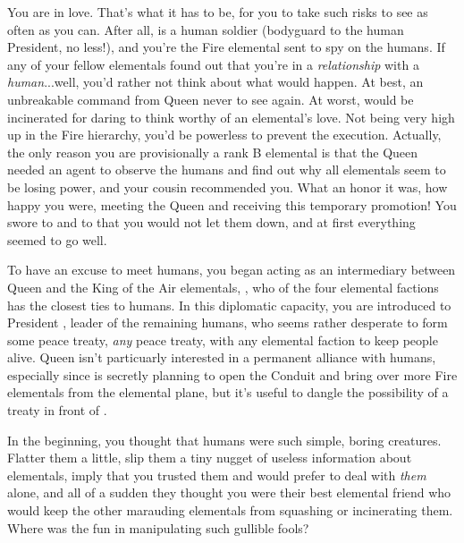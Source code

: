 \documentclass[char]{elementals}
\begin{document}
\name{\cJuliet{}}

You are in love.  That's what it has to be, for you to take such risks to see \cRomeo{\intro} as often as you can.  After all, \cRomeo{\they} is a human soldier (bodyguard to the human President, no less!), and you're the Fire elemental sent to spy on the humans.  If any of your fellow elementals found out that you're in a \emph{relationship} with a \emph{human}...well, you'd rather not think about what would happen.  At best, an unbreakable command from Queen \cQueen{\intro} never to see \cRomeo{} again.  At worst, \cRomeo{\they} would be incinerated for daring to think \cRomeo{\themselves} worthy of an elemental's love.  Not being very high up in the Fire hierarchy, you'd be powerless to prevent the execution.  Actually, the only reason you are provisionally a rank B elemental is that the Queen needed an agent to observe the humans and find out why all elementals seem to be losing power, and your cousin \cPyro{\intro} recommended you.  What an honor it was, how happy you were, meeting the Queen and receiving this temporary promotion!  You swore to \cQueen{\them} and to \cPyro{} that you would not let them down, and at first everything seemed to go well.

To have an excuse to meet humans, you began acting as an intermediary between Queen \cQueen{} and the King of the Air elementals, \cKing{\intro}, who of the four elemental factions has the closest ties to humans.  In this diplomatic capacity, you are introduced to President \cLeader{\intro}, leader of the remaining humans, who seems rather desperate to form some peace treaty, \emph{any} peace treaty, with any elemental faction to keep \cLeader{\their} people alive.  Queen \cQueen{} isn't particuarly interested in a permanent alliance with humans, especially since \cQueen{\they} is secretly planning to open the Conduit and bring over more Fire elementals from the elemental plane, but it's useful to dangle the possibility of a treaty in front of \cLeader{\them}.  

In the beginning, you thought that humans were such simple, boring creatures.  Flatter them a little, slip them a tiny nugget of useless information about elementals, imply that you trusted them and would prefer to deal with \emph{them} alone, and all of a sudden they thought you were their best elemental friend who would keep the other marauding elementals from squashing or incinerating them.  Where was the fun in manipulating such gullible fools?
\end{document}
